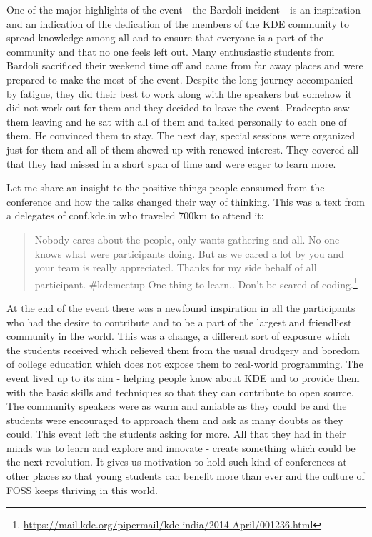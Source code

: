 One of the major highlights of the event - the Bardoli incident - is an inspiration and an indication of the dedication of the members of the KDE community to spread knowledge among all and to ensure that everyone is a part of  the community and that no one feels left out. Many enthusiastic students from Bardoli sacrificed their weekend time off and came from far away places and were prepared to make the most of the event. Despite the long journey accompanied by fatigue, they did their best to work along with the speakers but somehow it did not work out for them and they decided to leave the event. Pradeepto saw them leaving and he sat with all of them and talked personally to each one of them. He convinced them to stay. The next day, special sessions were organized just for them and all of them showed up with renewed interest. They covered all that they had missed in a short span of time and were eager to learn more.

Let me share an insight to the positive things people consumed from the conference and how the talks changed their way of thinking. This was a text from a delegates of conf.kde.in  who traveled 700km to attend it:

\begin{quote}Nobody cares about the people, only wants gathering and all. No one knows what were participants doing. But as we cared a lot by you and your team is really appreciated. Thanks for my side behalf of all participant.
\newline
\#kdemeetup One thing to learn.. Don’t be scared of coding.\footnote{\url{https://mail.kde.org/pipermail/kde-india/2014-April/001236.html}}\end{quote}

At the end of the event there was a newfound inspiration in all the participants who had the desire to contribute and to be a part of the largest and friendliest community in the world. This was a change, a different sort of exposure which the students received which relieved them from the usual drudgery and boredom of college education which does not expose them to real-world programming. The event lived up to its aim - helping people know about KDE and to provide them with the basic skills and techniques so that they can contribute to open source. The community speakers were as warm and amiable as they could be and the students were encouraged to approach them and ask as many doubts as they could. This event left the students asking for more. All that they had in their minds was to learn and explore and innovate - create something which could be the next revolution. It gives us motivation to hold such kind of conferences at other places so that young students can benefit more than ever and the culture of FOSS keeps thriving in this world.
